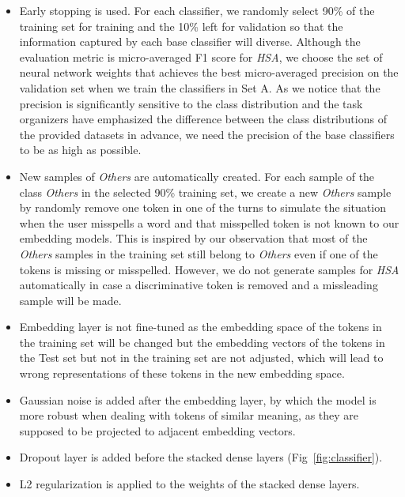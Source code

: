 \documentclass[11pt,a4paper]{article}
\begin{document}
\begin{itemize}

\item Early stopping is used. For each classifier, we randomly select 90\% of the training set for training and the 10\% left for validation so that the information captured by each base classifier will diverse. Although the evaluation metric is micro-averaged F1 score for {\em HSA}, we choose the set of neural network weights that achieves the best micro-averaged precision on the validation set when we train the classifiers in Set A. As we notice that the precision is significantly sensitive to the class distribution and the task organizers have emphasized the difference between the class distributions of the provided datasets in advance, we need the precision of the base classifiers to be as high as possible.

\item New samples of {\em Others} are automatically created. For each sample of the class {\em Others} in the selected 90\% training set, we create a new {\em Others} sample by randomly remove one token in one of the turns to simulate the situation when the user misspells a word and that misspelled token is not known to our embedding models. This is inspired by our observation that most of the {\em Others} samples in the training set still belong to {\em Others} even if one of the tokens is missing or misspelled. However, we do not generate samples for {\em HSA} automatically in case a discriminative token is removed and a missleading sample will be made.

\item Embedding layer is not fine-tuned as the embedding space of the tokens in the training set will be changed but the embedding vectors of the tokens in the Test set but not in the training set are not adjusted, which will lead to wrong representations of these tokens in the new embedding space.

\item Gaussian noise is added after the embedding layer, by which the model is more robust when dealing with tokens of similar meaning, as they are supposed to be projected to adjacent embedding vectors.

\item Dropout layer is added before the stacked dense layers (Fig~\ref{fig:classifier}).

\item L2 regularization is applied to the weights of the stacked dense layers.

\end{itemize}
\end{document}
